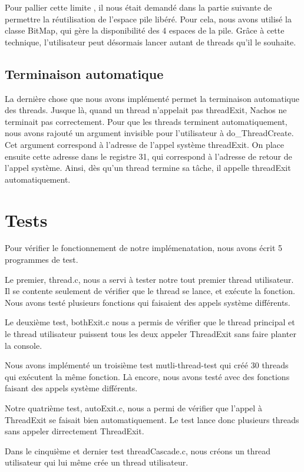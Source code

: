 \documentclass[12pt]{article}
\begin{document}
Pour pallier cette limite , il nous était demandé dans la partie suivante de permettre la réutilisation de l'espace pile libéré.
Pour cela, nous avons utilisé la classe BitMap, qui gère la disponibilité des 4 espaces de la pile.
Grâce à cette technique, l'utilisateur peut désormais lancer autant
de threads qu'il le souhaite.

\subsection{Terminaison automatique}
La dernière chose que nous avons implémenté permet la terminaison automatique des threads. Jusque là, quand un thread n'appelait pas threadExit, Nachos ne terminait pas correctement.
Pour que les threads terminent automatiquement, nous avons rajouté un argument invisible pour l'utilisateur à do\_ThreadCreate. Cet argument correspond à l'adresse de l'appel système threadExit.
On place ensuite cette adresse dans le registre 31, qui correspond à l'adresse de retour de l'appel système. Ainsi, dès qu'un thread termine sa tâche, il appelle threadExit automatiquement.

\section {Tests}

Pour vérifier le fonctionnement de notre implémenatation, nous avons écrit 5 programmes de test.

Le premier, thread.c, nous a servi à tester notre tout premier thread utilisateur. Il se contente seulement de vérifier que le thread se lance, et exécute la fonction. Nous avons testé plusieurs fonctions qui faisaient des appels système différents.

Le deuxième test, bothExit.c nous a permis de vérifier que le thread principal et le thread utilisateur puissent tous les deux appeler ThreadExit sans faire planter la console.

Nous avons implémenté un troisième test mutli-thread-test qui créé 30 threads qui exécutent la même fonction. Là encore, nous avons testé avec des fonctions faisant des appels système différents.

Notre quatrième test, autoExit.c, nous a permi de vérifier que l'appel à ThreadExit se faisait bien automatiquement. Le test lance donc plusieurs threads sans appeler dirrectement ThreadExit.

Dans le cinquième et dernier test threadCascade.c, nous créons un thread utilisateur qui lui même crée un thread utilisateur.
\end{document}
